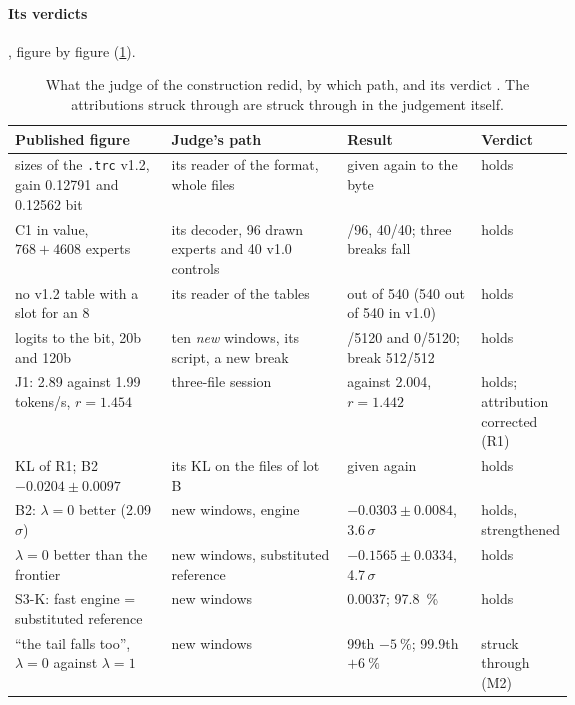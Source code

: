 \paragraph{Its verdicts}, figure by figure (\cref{t3jug:tab:chemins}).

\begin{table}[ht]
\centering\footnotesize
\caption[What the judge redid, and by which path]{What the judge of the construction redid, by which path, and its verdict \mes. The attributions struck through are struck through in the judgement itself.}
\label{t3jug:tab:chemins}
\begin{tabularx}{\linewidth}{@{}>{\raggedright\arraybackslash}p{0.28\linewidth}>{\raggedright\arraybackslash}X>{\raggedright\arraybackslash}p{0.24\linewidth}>{\raggedright\arraybackslash}p{0.13\linewidth}@{}}
\toprule
Published figure & Judge's path & Result & Verdict \\
\midrule
sizes of the \texttt{.trc} v1.2, gain \num{0.12791} and \num{0.12562} bit & its reader of the format, whole files & given again to the byte & holds \\
C1 in value, $768 + \num{4608}$ experts & its decoder, 96 drawn experts and 40 v1.0 controls & 96/96, 40/40; three breaks fall & holds \\
no v1.2 table with a slot for an 8 & its reader of the tables & 0 out of 540 (540 out of 540 in v1.0) & holds \\
logits to the bit, 20b and 120b & ten \emph{new} windows, its script, a new break & 0/\num{5120} and 0/\num{5120}; break 512/512 & holds \\
J1: 2.89 against 1.99 tokens/s, $r = 1.454$ & three-file session & 2.889 against 2.004, $r = 1.442$ & holds; attribution corrected (R1) \\
KL of R1; B2 $-\num{0.0204} \pm \num{0.0097}$ & its KL on the files of lot B & given again & holds \\
B2: $\lambda = 0$ better (\num{2.09}\,$\sigma$) & new windows, engine & $-\num{0.0303} \pm \num{0.0084}$, \num{3.6}\,$\sigma$ & holds, strengthened \\
$\lambda = 0$ better than the frontier & new windows, substituted reference & $-\num{0.1565} \pm \num{0.0334}$, \num{4.7}\,$\sigma$ & holds \\
S3-K: fast engine = substituted reference & new windows & \num{0.0037}; \SI{97.8}{\percent} & holds \\
``the tail falls too'', $\lambda = 0$ against $\lambda = 1$ & new windows & 99th $-\SI{5}{\percent}$; 99.9th $+\SI{6}{\percent}$ & struck through (M2) \\

\end{tabularx}
\end{table}
